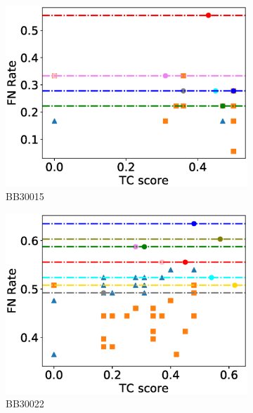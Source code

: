 \begin{figure}[!htbp]
\begin{adjustwidth}{-1cm}{-1cm}
\begin{subfigure}{0.22\textwidth}
			\includegraphics[width=\columnwidth]{Figure/summary/precomputedInit/Balibase/BB30015_fnrate_vs_tc_2}
			\caption{BB30015}
		\end{subfigure}
		\begin{subfigure}{0.22\textwidth}
			\includegraphics[width=\columnwidth]{Figure/summary/precomputedInit/Balibase/BB30022_fnrate_vs_tc_2}
			\caption{BB30022}
		\end{subfigure}	
		\begin{subfigure}{0.22\textwidth}

\end{subfigure}
\end{adjustwidth}
\end{figure}
